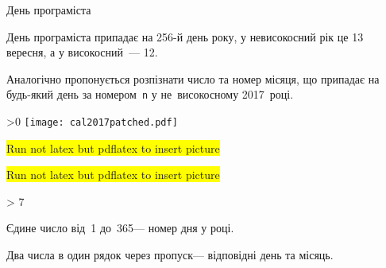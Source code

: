 \begin{problemAllDefault}{День програміста}

\ifAfour
{}
\fi

День програміста припадає на \mbox{256-й} день року, у невисокосний рік це 13 вересня, а у високосний~\nolinebreak[3] --- 12. 

Аналогічно пропонується розпізнати число та номер місяця, що припадає на будь-який день за номером~\texttt{n} у не~високосному 2017~році.



\ifAfour\else
\ifnum\pdfoutput>0
\noindent\texttt{[image: cal2017patched.pdf]}
\else
\begin{tiny}\colorbox{yellow}{Run not latex but pdflatex to insert picture}\par\end{tiny}
\begin{small}\colorbox{yellow}{Run not latex but pdflatex to insert picture}\end{small}
\ifnum\number\month > 7 \ERROR {}\fi
\fi
\fi

\InputFile
Єдине число від~1 до~365\nolinebreak[3] --- номер дня у році.

\OutputFile
Два числа в один рядок через пропуск\nolinebreak[3] --- відповідні день та місяць.

\ifAfour\else
\vspace{-0.25\baselineskip}
\fi

\Example
\hspace{-1em}\begin{exampleSimple}{5em}{5em}
\end{exampleSimple}\hspace*{-1em}

\end{problemAllDefault}

